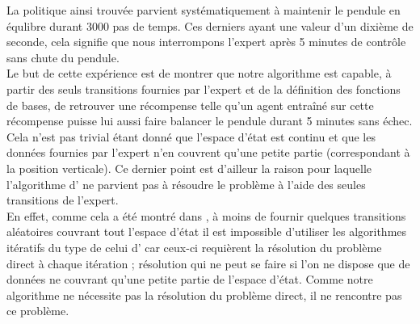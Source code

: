 \documentclass[publibook-draft]{CAp2012}
\begin{document}
La politique ainsi trouvée parvient systématiquement à maintenir le pendule en équlibre durant 3000 pas de temps. Ces derniers ayant une valeur d'un dixième de seconde, cela signifie que nous interrompons l'expert après 5 minutes de contrôle sans chute du pendule.\\

Le but de cette expérience est de montrer que notre algorithme est capable, à partir des seuls transitions fournies par l'expert et de la définition des fonctions de bases, de retrouver une récompense telle qu'un agent entraîné sur cette récompense puisse lui aussi faire balancer le pendule durant 5 minutes sans échec. Cela n'est pas trivial étant donné que l'espace d'état est continu et que les données fournies par l'expert n'en couvrent qu'une petite partie (correspondant à la position verticale). Ce dernier point est d'ailleur la raison pour laquelle l'algorithme d'\citet{abbeel2004apprenticeship} ne parvient pas à résoudre le problème à l'aide des seules transitions de l'expert.\\

En effet, comme cela a été montré dans \citep{klein2011batch}, à moins de fournir quelques transitions aléatoires couvrant tout l'espace d'état il est impossible d'utiliser les algorithmes itératifs du type de celui d'\citet{abbeel2004apprenticeship} car ceux-ci requièrent la résolution du problème direct à chaque itération ; résolution qui ne peut se faire si l'on ne dispose que de données ne couvrant qu'une petite partie de l'espace d'état. Comme notre algorithme ne nécessite pas la résolution du problème direct, il ne rencontre pas ce problème.
\end{document}
